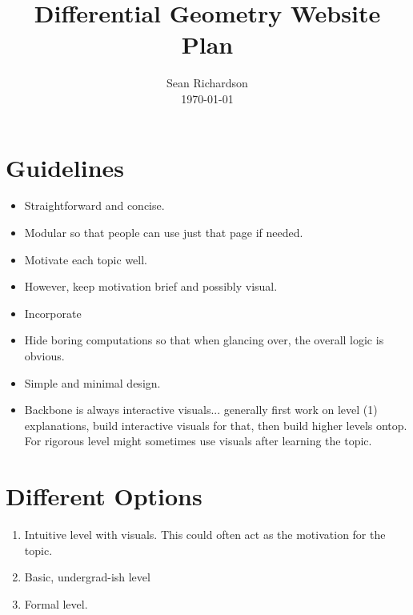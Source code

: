 \documentclass{amsart}
\title{Differential Geometry Website Plan}
\author{Sean Richardson \\\today}
\begin{document}
\maketitle

\section*{Guidelines}
\begin{itemize}
	\item Straightforward and concise.
	\item Modular so that people can use just that page if needed.
	\item Motivate each topic well.
	\item However, keep motivation brief and possibly visual.
	\item Incorporate 
	\item Hide boring computations so that when glancing over, the overall logic is obvious.
	\item Simple and minimal design.
	\item Backbone is always interactive visuals... generally first work on level (1) explanations, build interactive visuals for that, then build higher levels ontop. For rigorous level might sometimes use visuals after learning the topic.
\end{itemize}

\section*{Different Options}
\begin{enumerate}
	\item Intuitive level with visuals. This could often act as the motivation for the topic.
	\item Basic, undergrad-ish level 
	\item Formal level.
\end{enumerate}
\end{document}
